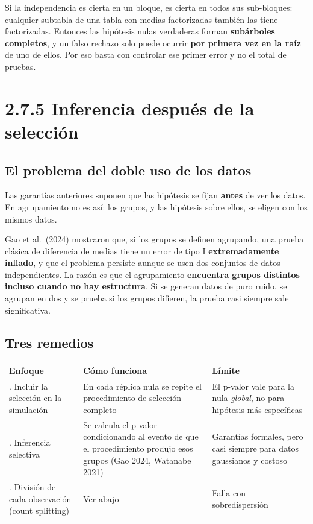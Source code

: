 \documentclass[11pt,a4paper]{article}
\begin{document}
Si la independencia es cierta en un bloque, es cierta en todos sus sub-bloques:
cualquier subtabla de una tabla con medias factorizadas también las tiene
factorizadas. Entonces las hipótesis nulas verdaderas forman \textbf{subárboles
completos}, y un falso rechazo solo puede ocurrir \textbf{por primera vez en la
raíz} de uno de ellos. Por eso basta con controlar ese primer error y no el total
de pruebas.

\section{2.7.5 Inferencia después de la selección}

\subsection{El problema del doble uso de los datos}

Las garantías anteriores suponen que las hipótesis se fijan \textbf{antes} de ver
los datos. En agrupamiento no es así: los grupos, y las hipótesis sobre ellos, se
eligen con los mismos datos.

Gao et al.\ (2024) mostraron que, si los grupos se definen agrupando, una prueba
clásica de diferencia de medias tiene un error de tipo I \textbf{extremadamente
inflado}, y que el problema persiste aunque se usen dos conjuntos de datos
independientes. La razón es que el agrupamiento \textbf{encuentra grupos distintos
incluso cuando no hay estructura}. Si se generan datos de puro ruido, se agrupan en
dos y se prueba si los grupos difieren, la prueba casi siempre sale significativa.

\subsection{Tres remedios}

\begin{center}
\renewcommand{\arraystretch}{1.3}
\begin{tabular}{@{}>{\raggedright\arraybackslash}p{3.8cm}>{\raggedright\arraybackslash}p{5.4cm}>{\raggedright\arraybackslash}p{4.4cm}@{}}
\toprule
\textbf{Enfoque} & \textbf{Cómo funciona} & \textbf{Límite} \\
\midrule
1. Incluir la selección en la simulación & En cada réplica nula se repite el procedimiento de selección completo & El p-valor vale para la nula \emph{global}, no para hipótesis más específicas \\
\midrule
2. Inferencia selectiva & Se calcula el p-valor condicionando al evento de que el procedimiento produjo esos grupos (Gao 2024, Watanabe 2021) & Garantías formales, pero casi siempre para datos gaussianos y costoso \\
\midrule
3. División de cada observación (count splitting) & Ver abajo & Falla con sobredispersión \\
\bottomrule
\end{tabular}
\end{center}
\end{document}
